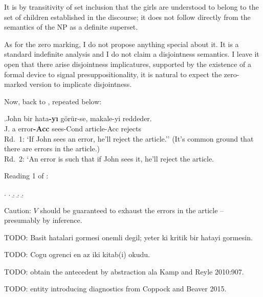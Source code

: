 \documentclass[11pt,a4paper]{article}
\begin{document}
It is by transitivity of set inclusion that the girls are understood to belong
to the set of children established in the discourse; it does not follow
directly from the semantics of the NP as a definite superset. 

As for the zero marking, I do not propose anything special about it. It is a
standard indefinite analysis and I do not claim a disjointness semantics. I
leave it open that there arise disjointness implicatures, supported by the
existence of a formal device to signal presuppositionality, it is natural to
expect the zero-marked version to implicate disjointness. 

Now, back to , repeated below:


\exg.\label{cond-w}John bir hata{\bf-yı} görür-se, makale-yi reddeder.\\
	J. a error{\bf-Acc} sees-Cond article-Acc rejects\\
	Rd.\ 1: `If John sees an error, he'll reject the article.'' (It's common
	ground that there are errors in the article.)\\
	Rd.\ 2: `An error is such that if John sees it, he'll reject the article.


\noindent Reading 1 of :

\ex.
\a.
\b.
\b.
\b.

Caution: $V$ should be guaranteed to exhaust the errors in the article --
presumably by inference.

TODO: Basit hatalari gormesi onemli degil; yeter ki kritik bir hatayi gormesin.

TODO: Cogu ogrenci en az iki kitab(i) okudu. 

TODO: obtain the antecedent by abstraction ala Kamp and Reyle
2010:907.

TODO: entity introducing diagnostics from Coppock and Beaver 2015.
\end{document}
